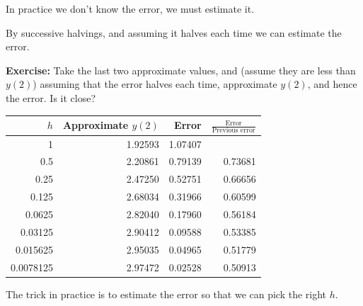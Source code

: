 \documentclass[10pt,aspectratio=169]{beamer}
\begin{document}
\begin{frame}
In practice we don't know the error, we must estimate it.

\medskip
\pause

By successive halvings, and assuming it halves each time we can estimate the
error.

\medskip
\pause

\textbf{Exercise:} Take the last two approximate values, and (assume they
are less than $y(2)$) assuming that the error halves each time, approximate
$y(2)$, and hence the error.  Is it close?

\medskip

\hspace*{\fill}
\begin{tabular}{@{}rrrr@{}}
\toprule
$h$ & Approximate $y(2)$ & Error & $\frac{\text{Error}}{\text{Previous error}}$ \\
\midrule
1        & 1.92593 & 1.07407 & \\
0.5      & 2.20861 & 0.79139 & 0.73681 \\
0.25     & 2.47250 & 0.52751 & 0.66656 \\
0.125    & 2.68034 & 0.31966 & 0.60599 \\
0.0625   & 2.82040 & 0.17960 & 0.56184 \\
0.03125  & 2.90412 & 0.09588 & 0.53385 \\
0.015625 & 2.95035 & 0.04965 & 0.51779 \\
0.0078125& 2.97472 & 0.02528 & 0.50913 \\
\bottomrule
\end{tabular}
\hspace*{\fill}

\medskip
\pause

The trick in practice is to estimate the error so that we can pick the right
$h$.

\end{frame}
\end{document}

